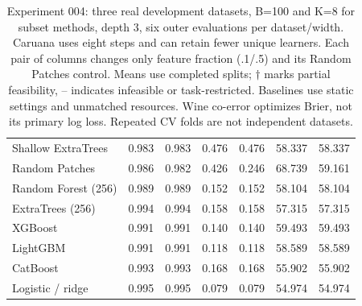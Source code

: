 \begin{table}[p]
\begin{tabular}{lrrrrrr}
Shallow ExtraTrees & 0.983 & 0.983 & 0.476 & 0.476 & 58.337 & 58.337 \\
Random Patches & 0.986 & 0.982 & 0.426 & 0.246 & 68.739 & 59.161 \\
Random Forest (256) & 0.989 & 0.989 & 0.152 & 0.152 & 58.104 & 58.104 \\
ExtraTrees (256) & 0.994 & 0.994 & 0.158 & 0.158 & 57.315 & 57.315 \\
XGBoost & 0.991 & 0.991 & 0.140 & 0.140 & 59.493 & 59.493 \\
LightGBM & 0.991 & 0.991 & 0.118 & 0.118 & 58.589 & 58.589 \\
CatBoost & 0.993 & 0.993 & 0.168 & 0.168 & 55.902 & 55.902 \\
Logistic / ridge & 0.995 & 0.995 & 0.079 & 0.079 & 54.974 & 54.974 \\
\bottomrule
\end{tabular}
\caption{Experiment 004: three real development datasets, B=100 and K=8 for subset methods, depth 3, six outer evaluations per dataset/width. Caruana uses eight steps and can retain fewer unique learners. Each pair of columns changes only feature fraction (.1/.5) and its Random Patches control. Means use completed splits; $\dagger$ marks partial feasibility, -- indicates infeasible or task-restricted. Baselines use static settings and unmatched resources. Wine co-error optimizes Brier, not its primary log loss. Repeated CV folds are not independent datasets.}
\end{table}
